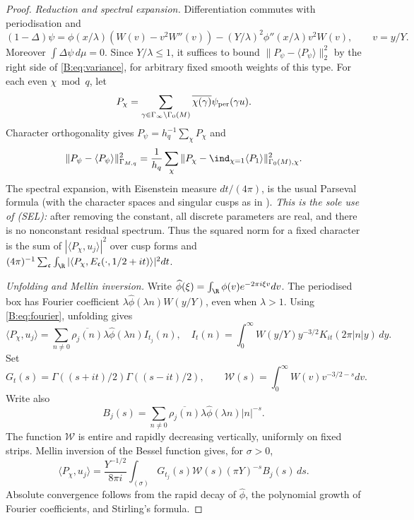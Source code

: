 \begin{proof}
\emph{Reduction and spectral expansion.}
Differentiation commutes with periodisation and
\[
 (1-\Delta)\psi
 =\phi(x/\lambda)(W(v)-v^2W''(v))
       -(Y/\lambda)^2\phi''(x/\lambda)v^2W(v),\qquad v=y/Y.
\]
Moreover \(\int\Delta\psi\,d\mu=0\). Since \(Y/\lambda\le1\), it suffices
to bound \(\|P_\psi-\langle P_\psi\rangle\|_2^2\) by the right side of
\eqref{B:eq:variance}, for arbitrary fixed smooth weights of this type.
For each even \(\chi\bmod q\), let
\[
 P_\chi=\sum_{\gamma\in\Gamma_\infty\backslash\Gamma_0(M)}
            \overline{\chi(\gamma)}\psi_{\rm per}(\gamma u).
\]
Character orthogonality gives \(P_\psi=h_q^{-1}\sum_\chi P_\chi\) and
\begin{equation}\label{B:eq:char-norm}
 \|P_\psi-\langle P_\psi\rangle\|_{\Gamma_{M,q}}^2
 =\frac1{h_q}\sum_\chi
       \|P_\chi-\ind_{\chi=1}\langle P_1\rangle\|_{\Gamma_0(M),\chi}^2.
\end{equation}
The spectral expansion, with Eisenstein measure \(dt/(4\pi)\), is the
usual Parseval formula \cite[Theorem 7.3]{Iw} (with the character
spaces and singular cusps as in \cite[\S4.1]{Dr}).
\emph{This is the sole use of (SEL):} after removing the constant,
all discrete parameters are real, and there is no nonconstant residual
spectrum. Thus the squared norm for a fixed character is the sum of
\(|\langle P_\chi,u_j\rangle|^2\) over cusp forms and
\((4\pi)^{-1}\sum_{\mathfrak c}\int_\R
|\langle P_\chi,E_{\mathfrak c}(\cdot,1/2+it)\rangle|^2dt\).

\emph{Unfolding and Mellin inversion.}
Write \(\widehat\phi(\xi)=\int_\R\phi(v)e^{-2\pi i\xi v}dv\).
The periodised box has Fourier coefficient
\(\lambda\widehat\phi(\lambda n)W(y/Y)\), even when \(\lambda>1\).
Using \eqref{B:eq:fourier}, unfolding gives
\[
 \langle P_\chi,u_j\rangle
 =\sum_{n\ne0}\overline{\rho_j(n)}\lambda\widehat\phi(\lambda n)I_{t_j}(n),
 \quad I_t(n)=\int_0^\infty W(y/Y)y^{-3/2}K_{it}(2\pi|n|y)\,dy.
\]
Set
\[
 G_t(s)=\Gamma((s+it)/2)\Gamma((s-it)/2),\qquad
 \mathcal W(s)=\int_0^\infty W(v)v^{-3/2-s}dv.
\]
Write also
\[
 B_j(s)=\sum_{n\ne0}\overline{\rho_j(n)}
              \lambda\widehat\phi(\lambda n)|n|^{-s}.
\]
The function \(\mathcal W\) is entire and rapidly decreasing vertically,
uniformly on fixed strips. Mellin inversion of the Bessel function gives,
for \(\sigma>0\),
\begin{equation}\label{B:eq:mellin}
 \langle P_\chi,u_j\rangle
 =\frac{Y^{-1/2}}{8\pi i}\int_{(\sigma)}
        G_{t_j}(s)\mathcal W(s)(\pi Y)^{-s}B_j(s)\,ds.
\end{equation}
Absolute convergence follows from the rapid decay of
\(\widehat\phi\), the polynomial growth of Fourier coefficients, and
Stirling's formula.


\end{proof}
